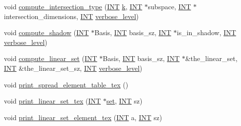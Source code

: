 \begin{DoxyCompactItemize}
void \mbox{\hyperlink{classdesarguesian__spread_a7eca8625c43342d9f0608fe1235fce2c}{compute\+\_\+intersection\+\_\+type}} (\mbox{\hyperlink{galois_8h_a09fddde158a3a20bd2dcadb609de11dc}{I\+NT}} \mbox{\hyperlink{simeon_8_c_a43fa990200c3ddd47c35f151bd4d66bf}{k}}, \mbox{\hyperlink{galois_8h_a09fddde158a3a20bd2dcadb609de11dc}{I\+NT}} $\ast$subspace, \mbox{\hyperlink{galois_8h_a09fddde158a3a20bd2dcadb609de11dc}{I\+NT}} $\ast$intersection\+\_\+dimensions, \mbox{\hyperlink{galois_8h_a09fddde158a3a20bd2dcadb609de11dc}{I\+NT}} \mbox{\hyperlink{simeon_8_c_a818073fbcc2f439e7c56952f67386122}{verbose\+\_\+level}})
\item 
void \mbox{\hyperlink{classdesarguesian__spread_a2f95efc0417bea1d34a009bf675f2bf2}{compute\+\_\+shadow}} (\mbox{\hyperlink{galois_8h_a09fddde158a3a20bd2dcadb609de11dc}{I\+NT}} $\ast$Basis, \mbox{\hyperlink{galois_8h_a09fddde158a3a20bd2dcadb609de11dc}{I\+NT}} basis\+\_\+sz, \mbox{\hyperlink{galois_8h_a09fddde158a3a20bd2dcadb609de11dc}{I\+NT}} $\ast$is\+\_\+in\+\_\+shadow, \mbox{\hyperlink{galois_8h_a09fddde158a3a20bd2dcadb609de11dc}{I\+NT}} \mbox{\hyperlink{simeon_8_c_a818073fbcc2f439e7c56952f67386122}{verbose\+\_\+level}})
\item 
void \mbox{\hyperlink{classdesarguesian__spread_a3ae1799cf7300894df22685686584bac}{compute\+\_\+linear\+\_\+set}} (\mbox{\hyperlink{galois_8h_a09fddde158a3a20bd2dcadb609de11dc}{I\+NT}} $\ast$Basis, \mbox{\hyperlink{galois_8h_a09fddde158a3a20bd2dcadb609de11dc}{I\+NT}} basis\+\_\+sz, \mbox{\hyperlink{galois_8h_a09fddde158a3a20bd2dcadb609de11dc}{I\+NT}} $\ast$\&the\+\_\+linear\+\_\+set, \mbox{\hyperlink{galois_8h_a09fddde158a3a20bd2dcadb609de11dc}{I\+NT}} \&the\+\_\+linear\+\_\+set\+\_\+sz, \mbox{\hyperlink{galois_8h_a09fddde158a3a20bd2dcadb609de11dc}{I\+NT}} \mbox{\hyperlink{simeon_8_c_a818073fbcc2f439e7c56952f67386122}{verbose\+\_\+level}})
\item 
void \mbox{\hyperlink{classdesarguesian__spread_adadeb00cbd5c474c8254afd0120eff1c}{print\+\_\+spread\+\_\+element\+\_\+table\+\_\+tex}} ()
\item 
void \mbox{\hyperlink{classdesarguesian__spread_a4bf2a6748721173d54d8b1cdff57076f}{print\+\_\+linear\+\_\+set\+\_\+tex}} (\mbox{\hyperlink{galois_8h_a09fddde158a3a20bd2dcadb609de11dc}{I\+NT}} $\ast$\mbox{\hyperlink{nauty_8h_a9690bea211101f22a5e154087590c3da}{set}}, \mbox{\hyperlink{galois_8h_a09fddde158a3a20bd2dcadb609de11dc}{I\+NT}} sz)
\item 
void \mbox{\hyperlink{classdesarguesian__spread_a773fe12dae0feab40be49b75130b851a}{print\+\_\+linear\+\_\+set\+\_\+element\+\_\+tex}} (\mbox{\hyperlink{galois_8h_a09fddde158a3a20bd2dcadb609de11dc}{I\+NT}} a, \mbox{\hyperlink{galois_8h_a09fddde158a3a20bd2dcadb609de11dc}{I\+NT}} sz)
\end{DoxyCompactItemize}

